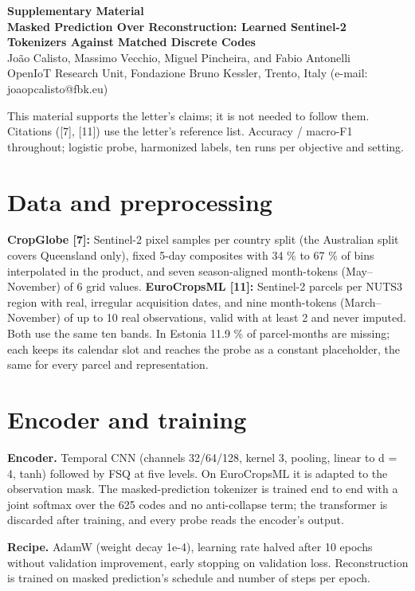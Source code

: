\documentclass[10pt]{article}
\begin{document}
\small
\begin{center}
{\large\bfseries Supplementary Material}\\[3pt]
{\bfseries Masked Prediction Over Reconstruction: Learned Sentinel-2 Tokenizers Against Matched Discrete Codes}\\[4pt]
Jo\~{a}o Calisto, Massimo Vecchio, Miguel Pincheira, and Fabio Antonelli\\
{\small OpenIoT Research Unit, Fondazione Bruno Kessler, Trento, Italy (e-mail: joaopcalisto@fbk.eu)}
\end{center}
\vspace{2pt}

This material supports the letter's claims; it is not needed to follow them. Citations ([7], [11]) use the letter's reference list. Accuracy / macro-F1 throughout; logistic probe, harmonized labels, ten runs per objective and setting.

\section{Data and preprocessing}

\textbf{CropGlobe [7]:} Sentinel-2 pixel samples per country split (the Australian split covers Queensland only), fixed 5-day composites with 34 \% to 67 \% of bins interpolated in the product, and seven season-aligned month-tokens (May--November) of 6 grid values. \textbf{EuroCropsML [11]:} Sentinel-2 parcels per NUTS3 region with real, irregular acquisition dates, and nine month-tokens (March--November) of up to 10 real observations, valid with at least 2 and never imputed. Both use the same ten bands. In Estonia 11.9 \% of parcel-months are missing; each keeps its calendar slot and reaches the probe as a constant placeholder, the same for every parcel and representation.

\section{Encoder and training}

\textbf{Encoder.} Temporal CNN (channels 32/64/128, kernel 3, pooling, linear to d = 4, tanh) followed by FSQ at five levels. On EuroCropsML it is adapted to the observation mask. The masked-prediction tokenizer is trained end to end with a joint softmax over the 625 codes and no anti-collapse term; the transformer is discarded after training, and every probe reads the encoder's output.

\textbf{Recipe.} AdamW (weight decay 1e-4), learning rate halved after 10 epochs without validation improvement, early stopping on validation loss. Reconstruction is trained on masked prediction's schedule and number of steps per epoch.
\end{document}

